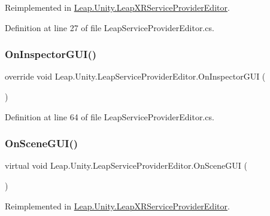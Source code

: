 Reimplemented in \mbox{\hyperlink{class_leap_1_1_unity_1_1_leap_x_r_service_provider_editor_af1b2b20f9a7da319b8c6b5b8b95f9e9c}{Leap.\+Unity.\+Leap\+X\+R\+Service\+Provider\+Editor}}.



Definition at line 27 of file Leap\+Service\+Provider\+Editor.\+cs.

\mbox{\label{class_leap_1_1_unity_1_1_leap_service_provider_editor_ae7198f5589929f399b0956e271139494}} 
\subsubsection{\texorpdfstring{OnInspectorGUI()}{OnInspectorGUI()}}
{\footnotesize\ttfamily override void Leap.\+Unity.\+Leap\+Service\+Provider\+Editor.\+On\+Inspector\+G\+UI (\begin{DoxyParamCaption}{ }\end{DoxyParamCaption})}



Definition at line 64 of file Leap\+Service\+Provider\+Editor.\+cs.

\mbox{\label{class_leap_1_1_unity_1_1_leap_service_provider_editor_a25d4ecd6fae74e7fd8bf6d358fe93568}} 
\subsubsection{\texorpdfstring{OnSceneGUI()}{OnSceneGUI()}}
{\footnotesize\ttfamily virtual void Leap.\+Unity.\+Leap\+Service\+Provider\+Editor.\+On\+Scene\+G\+UI (\begin{DoxyParamCaption}{ }\end{DoxyParamCaption})\hspace{0.3cm}{\ttfamily [virtual]}}



Reimplemented in \mbox{\hyperlink{class_leap_1_1_unity_1_1_leap_x_r_service_provider_editor_af109f9fa67a87b0802b3a55f291726ba}{Leap.\+Unity.\+Leap\+X\+R\+Service\+Provider\+Editor}}.



